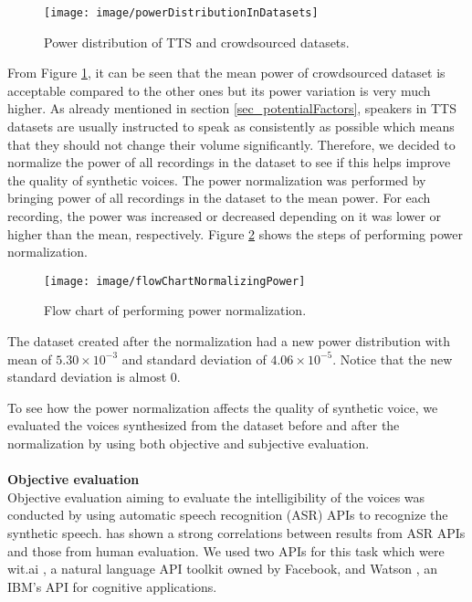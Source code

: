 \documentclass[12pt]{article}
\begin{document}
\begin{figure}[t]
\begin{center}
\texttt{[image: image/powerDistributionInDatasets]}
\end{center}
\vspace{-0.3cm}
\caption[Power distribution in TTS and crowdsourced datasets.]{Power distribution of TTS and crowdsourced datasets.}
\label{fig_powerDistribution}
\end{figure}

From Figure \ref{fig_powerDistribution}, it can be seen that the mean power of crowdsourced dataset is acceptable compared to the other ones but its power variation is very much higher. As already mentioned in section \ref{sec_potentialFactors}, speakers in TTS datasets are usually instructed to speak as consistently as possible which means that they should not change their volume significantly. Therefore, we decided to normalize the power of all recordings in the dataset to see if this helps improve the quality of synthetic voices. The power normalization was performed by bringing power of all recordings in the dataset to the mean power. For each recording, the power was increased or decreased depending on it was lower or higher than the mean, respectively. Figure \ref{fig_normalizingPower} shows the steps of performing power normalization.
\begin{figure}[t]
\begin{center}
\texttt{[image: image/flowChartNormalizingPower]}
\end{center}
\vspace{-0.3cm}
\caption[Flow chart of performing power normalization.]{Flow chart of performing power normalization.}
\label{fig_normalizingPower}
\end{figure}
The dataset created after the normalization had a new power distribution with mean of $5.30\times10^{-3}$ and standard deviation of $4.06\times10^{-5}$. Notice that the new standard deviation is almost 0.

To see how the power normalization affects the quality of synthetic voice, we evaluated the voices synthesized from the dataset before and after the normalization by using both objective and subjective evaluation.\\\\
\textbf{Objective evaluation}
\vspace{0.28cm}\\
Objective evaluation aiming to evaluate the intelligibility of the voices was conducted by using automatic speech recognition (ASR) APIs to recognize the synthetic speech. \cite{utteranceSelectionCooper2017} has shown a strong correlations between results from ASR APIs and those from human evaluation. We used two APIs for this task which were wit.ai \cite{witai}, a natural language API toolkit owned by Facebook, and Watson \cite{watson}, an IBM’s API for cognitive applications.
\end{document}
